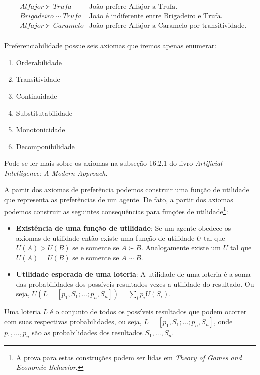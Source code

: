 \documentclass[a4paper,10pt]{article}
\theoremstyle{plain}
\begin{document}
\begin{align*}
  &Alfajor \succ Trufa &\text{João prefere Alfajor a Trufa.} \\
  &Brigadeiro \sim Trufa &\text{João é indiferente entre Brigadeiro e Trufa.} \\
  &Alfajor \succ Caramelo &\text{João prefere Alfajor a Caramelo por transitividade.}\\
\end{align*}

Preferenciabilidade possue seis axiomas que iremos apenas enumerar:

\begin{enumerate}
  \item Orderabilidade
  \item Transitividade
  \item Continuidade
  \item Substitutabilidade
  \item Monotonicidade
  \item Decomponibilidade
\end{enumerate}

Pode-se ler mais sobre os axiomas na subseção 16.2.1 do livro \textit{Artificial Intelligence: A
Modern Approach}\cite{aima}.

A partir dos axiomas de preferência podemos construir uma função de utilidade que representa as
preferências de um agente. De fato, a partir dos axiomas podemos construir as seguintes
consequências para funções de utilidade\footnote{A prova para estas construções podem ser lidas em
\textit{Theory of Games and Economic Behavior}\cite{neumann-morgenstern}.}:

\begin{itemize}
  \item \textbf{Existência de uma função de utilidade}: Se um agente obedece os axiomas de
    utilidade então existe uma função de utilidade $U$ tal que $U(A) > U(B)$ se e somente se
    $A \succ B$. Analogamente existe um $U$ tal que $U(A) = U(B)$ se e somente se $A \sim B$.
  \item \textbf{Utilidade esperada de uma loteria}: A utilidade de uma loteria é a soma das
    probabilidades dos possíveis resultados vezes a utilidade do resultado. Ou seja, $U(L=[p_1,S_1;
    ...;p_n,S_n]) = \sum_i p_iU(S_i)$.
\end{itemize}

Uma loteria $L$ é o conjunto de todos os possíveis resultados que podem ocorrer com suas
respectivas probabilidades, ou seja, $L = [p_1,S_1;...;p_n,S_n]$, onde $p_1,...,p_n$ são as
probabilidades dos resultados $S_1,...,S_n$.
\end{document}
